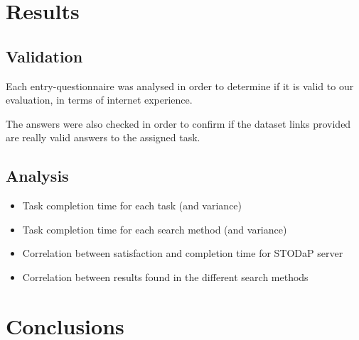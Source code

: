 \section{Results}
\label{sec:eval_results}


\subsection{Validation}
Each entry-questionnaire was analysed in order to determine if it is valid to our evaluation, in terms of internet experience.

The answers were also checked in order to confirm if the dataset links provided are really valid answers to the assigned task.

\subsection{Analysis}
\begin{itemize}
	\item Task completion time for each task (and variance) \cite{Xu2009}
	\item Task completion time for each search method (and variance) \cite{Xu2009}
	\item Correlation between satisfaction and completion time for STODaP server \cite{Xu2009}
	\item Correlation between results found in the different search methods \cite{Vaughan2004}

\end{itemize}


\section{Conclusions}
\label{sec:conclusion}






